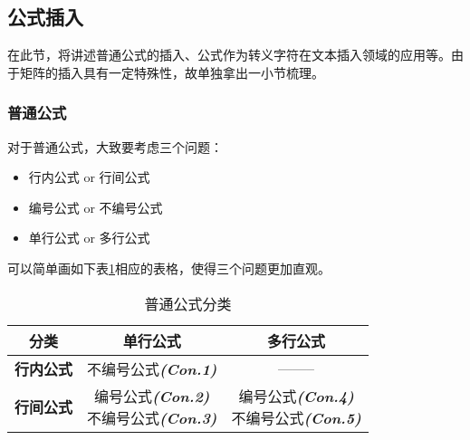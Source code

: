 \documentclass[11pt]{article}
\begin{document}
    \subsection{公式插入}
    在此节，将讲述普通公式的插入、公式作为转义字符在文本插入领域的应用等。由于矩阵的插入具有一定特殊性，故单独拿出一小节梳理。
    \subsubsection{普通公式}
    对于普通公式，大致要考虑三个问题：
    \begin{itemize}
    	\item 行内公式 or 行间公式 
    	\item 编号公式 or 不编号公式 
    	\item 单行公式 or 多行公式
    \end{itemize}
    可以简单画如下表\ref{table4}相应的表格，使得三个问题更加直观。
    \begin{table}[H]
    	\centering
    	\caption{普通公式分类}
    	\setlength{\tabcolsep}{20pt}
    	\begin{tabular}{c|cc}
    		\toprule
    		分类 & \textbf{单行公式} & \textbf{多行公式} \\
    		\midrule
    		\textbf{行内公式} & 不编号公式\textbf{\textit{(Con.1)}} & -------- \\
    		\hline
    		\textbf{行间公式} & \makecell[c]{编号公式\textbf{\textit{(Con.2)}} \\ 不编号公式\textbf{\textit{(Con.3)}}} & \makecell[c]{编号公式\textbf{\textit{(Con.4)}} \\ 不编号公式\textbf{\textit{(Con.5)}}} \\
    		\bottomrule
    	\end{tabular}
    	\label{table4}
    \end{table}
    
\end{document}
